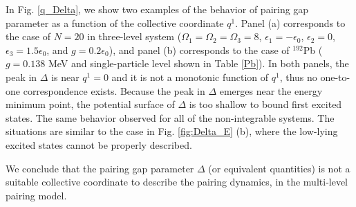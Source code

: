 \documentclass[11pt]{book} %
\begin{document}
In Fig. \ref{q_Delta}, we show two examples of the behavior of pairing gap parameter as a function of the collective coordinate $q^1$.
Panel (a) corresponds to the case of $N=20$ in three-level system ($\Omega_1=\Omega_2=\Omega_3=8$,
$\epsilon_1=-\epsilon_0$, $\epsilon_2=0$, $\epsilon_3=1.5\epsilon_0$,
and $g=0.2\epsilon_0$), and panel (b) corresponds to the case of ${}^{192}$Pb ($g=0.138$ MeV and single-particle level shown in Table \ref{Pb}).
In both panels, the peak in $\Delta$ is near $q^1=0$ and it is not a monotonic
function of $q^1$, thus no one-to-one correspondence exists. 
Because the peak in $\Delta$ emerges near the energy minimum point, the potential surface of $\Delta$ is too shallow to bound first excited states. 
The same behavior observed for all of the non-integrable systems.
The situations are similar to the case in Fig. \ref{fig:Delta_E} (b), where the low-lying excited states cannot be properly described.

We conclude that the pairing gap parameter $\Delta$ (or equivalent quantities) is not a suitable collective coordinate to describe the pairing dynamics, in the multi-level pairing model.



\end{document}
